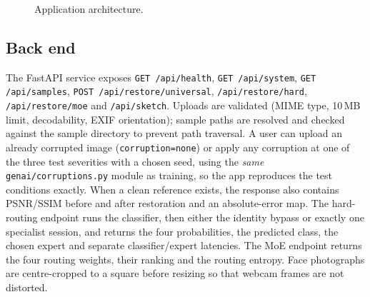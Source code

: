 \begin{figure}[t]
\centering
{}
\caption{Application architecture.}
\label{fig:apparch}
\end{figure}

\subsection{Back end}
The FastAPI service exposes \texttt{GET /api/health}, \texttt{GET /api/system}, \texttt{GET /api/samples}, \texttt{POST /api/restore/universal}, \texttt{/api/restore/hard}, \texttt{/api/restore/moe} and \texttt{/api/sketch}. Uploads are validated (MIME type, 10\,MB limit, decodability, EXIF orientation); sample paths are resolved and checked against the sample directory to prevent path traversal. A user can upload an already corrupted image (\texttt{corruption=none}) or apply any corruption at one of the three test severities with a chosen seed, using the \emph{same} \texttt{genai/corruptions.py} module as training, so the app reproduces the test conditions exactly. When a clean reference exists, the response also contains PSNR/SSIM before and after restoration and an absolute-error map. The hard-routing endpoint runs the classifier, then either the identity bypass or exactly one specialist session, and returns the four probabilities, the predicted class, the chosen expert and separate classifier/expert latencies. The MoE endpoint returns the four routing weights, their ranking and the routing entropy. Face photographs are centre-cropped to a square before resizing so that webcam frames are not distorted.

